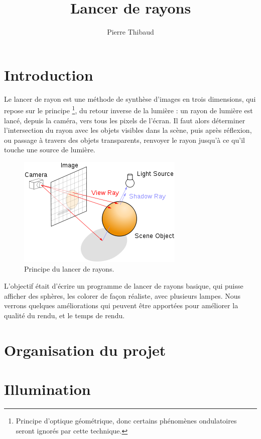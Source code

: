\documentclass[10pt,a4paper]{article}
\author{Pierre \bsc{Donat-Bouillud} Thibaud \bsc{Ehret}}
\title{Lancer de rayons}
\begin{document}
\maketitle

\section*{Introduction} %
Le lancer de rayon est une méthode de synthèse d'images en trois dimensions, qui repose sur le principe \footnote{Principe d'optique géométrique, donc certains phénomènes
ondulatoires seront ignorés par cette technique.}, du retour inverse de la lumière : un rayon de lumière est lancé, depuis la caméra, vers tous les pixels de l'écran. 
Il faut alors déterminer l'intersection du rayon avec les objets visibles dans la scène, puis après réflexion, ou passage à travers des objets transparents, renvoyer le rayon jusqu'à ce qu'il touche une source de lumière.
\begin{figure}[!h]
\begin{center}
\includegraphics[scale=0.5]{../presentation/raytracing.png}
\end{center}
\caption{Principe du lancer de rayons.}
\end{figure}
L'objectif était d'écrire un programme de lancer de rayons basique, qui puisse afficher des sphères, les colorer de façon réaliste, avec plusieurs lampes.
Nous verrons quelques améliorations qui peuvent être apportées pour améliorer la qualité du rendu, et le temps de rendu.

\section{Organisation du projet} %



\section{Illumination} %

\end{document}
